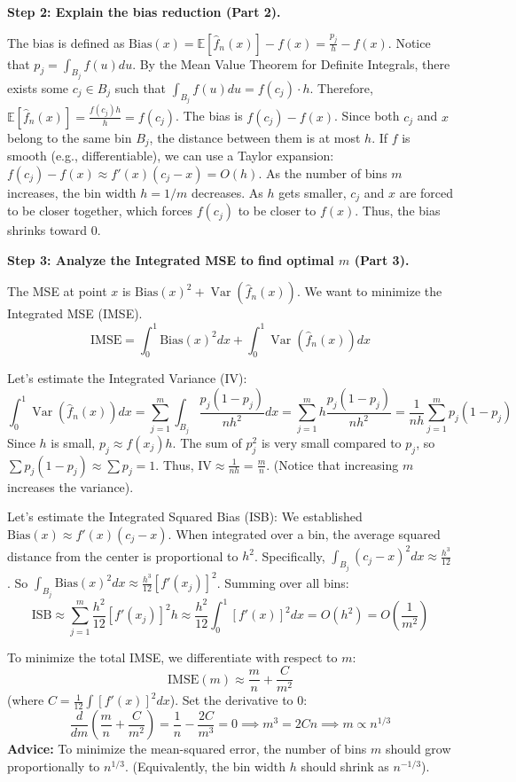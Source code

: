 \begin{solution}
\textbf{Step 2: Explain the bias reduction (Part 2).}

The bias is defined as $\text{Bias}(x) = \mathbb{E}[\hat{f}_n(x)] - f(x) = \frac{p_j}{h} - f(x)$.
Notice that $p_j = \int_{B_j} f(u) du$. By the Mean Value Theorem for Definite Integrals, there exists some $c_j \in B_j$ such that $\int_{B_j} f(u) du = f(c_j) \cdot h$.
Therefore, $\mathbb{E}[\hat{f}_n(x)] = \frac{f(c_j)h}{h} = f(c_j)$.
The bias is $f(c_j) - f(x)$. Since both $c_j$ and $x$ belong to the same bin $B_j$, the distance between them is at most $h$.
If $f$ is smooth (e.g., differentiable), we can use a Taylor expansion: $f(c_j) - f(x) \approx f'(x)(c_j - x) = O(h)$.
As the number of bins $m$ increases, the bin width $h = 1/m$ decreases. As $h$ gets smaller, $c_j$ and $x$ are forced to be closer together, which forces $f(c_j)$ to be closer to $f(x)$. Thus, the bias shrinks toward 0.

\textbf{Step 3: Analyze the Integrated MSE to find optimal $m$ (Part 3).}

The MSE at point $x$ is $\text{Bias}(x)^2 + \operatorname{Var}(\hat{f}_n(x))$. We want to minimize the Integrated MSE (IMSE).
\[ \text{IMSE} = \int_0^1 \text{Bias}(x)^2 dx + \int_0^1 \operatorname{Var}(\hat{f}_n(x)) dx \]

Let's estimate the Integrated Variance (IV):
\[ \int_0^1 \operatorname{Var}(\hat{f}_n(x)) dx = \sum_{j=1}^m \int_{B_j} \frac{p_j(1 - p_j)}{n h^2} dx = \sum_{j=1}^m h \frac{p_j(1 - p_j)}{n h^2} = \frac{1}{nh} \sum_{j=1}^m p_j(1 - p_j) \]
Since $h$ is small, $p_j \approx f(x_j)h$. The sum of $p_j^2$ is very small compared to $p_j$, so $\sum p_j(1-p_j) \approx \sum p_j = 1$.
Thus, $\text{IV} \approx \frac{1}{nh} = \frac{m}{n}$. (Notice that increasing $m$ increases the variance).

Let's estimate the Integrated Squared Bias (ISB):
We established $\text{Bias}(x) \approx f'(x)(c_j - x)$. When integrated over a bin, the average squared distance from the center is proportional to $h^2$. Specifically, $\int_{B_j} (c_j - x)^2 dx \approx \frac{h^3}{12}$.
So $\int_{B_j} \text{Bias}(x)^2 dx \approx \frac{h^3}{12} [f'(x_j)]^2$.
Summing over all bins:
\[ \text{ISB} \approx \sum_{j=1}^m \frac{h^2}{12} [f'(x_j)]^2 h \approx \frac{h^2}{12} \int_0^1 [f'(x)]^2 dx = O(h^2) = O\left(\frac{1}{m^2}\right) \]

To minimize the total IMSE, we differentiate with respect to $m$:
\[ \text{IMSE}(m) \approx \frac{m}{n} + \frac{C}{m^2} \]
(where $C = \frac{1}{12} \int [f'(x)]^2 dx$).
Set the derivative to 0:
\[ \frac{d}{dm} \left( \frac{m}{n} + \frac{C}{m^2} \right) = \frac{1}{n} - \frac{2C}{m^3} = 0 \implies m^3 = 2Cn \implies m \propto n^{1/3} \]
\textbf{Advice:} To minimize the mean-squared error, the number of bins $m$ should grow proportionally to $n^{1/3}$. (Equivalently, the bin width $h$ should shrink as $n^{-1/3}$).
\end{solution}

